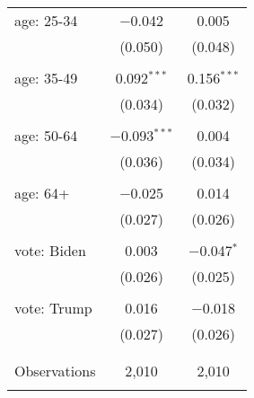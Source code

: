 \begin{tabular}{@{\extracolsep{5pt}}lcc}
 age: 25-34 & $-$0.042 & 0.005 \\ 
  & (0.050) & (0.048) \\ 
  & & \\ 
 age: 35-49 & 0.092$^{***}$ & 0.156$^{***}$ \\ 
  & (0.034) & (0.032) \\ 
  & & \\ 
 age: 50-64 & $-$0.093$^{***}$ & 0.004 \\ 
  & (0.036) & (0.034) \\ 
  & & \\ 
 age: 64+ & $-$0.025 & 0.014 \\ 
  & (0.027) & (0.026) \\ 
  & & \\ 
 vote: Biden & 0.003 & $-$0.047$^{*}$ \\ 
  & (0.026) & (0.025) \\ 
  & & \\ 
 vote: Trump & 0.016 & $-$0.018 \\ 
  & (0.027) & (0.026) \\ 
  & & \\ 
\hline \\[-1.8ex] 

Observations & 2,010 & 2,010 \\ 
\hline 
\hline \\[-1.8ex] 
\end{tabular} 
